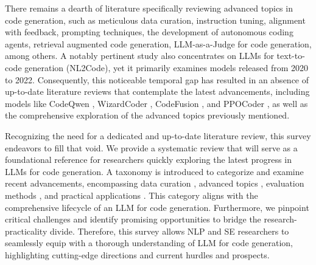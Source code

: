 There remains a dearth of literature specifically reviewing advanced topics in code generation, such as meticulous data curation, instruction tuning, alignment with feedback, prompting techniques, the development of autonomous coding agents, retrieval augmented code generation, LLM-as-a-Judge for code generation, among others.
A notably pertinent study \cite{athiwaratkun2022multi,zan2023large} also concentrates on LLMs for text-to-code generation (NL2Code), yet it primarily examines models released from 2020 to 2022. 
Consequently, this noticeable temporal gap has resulted in an absence of up-to-date literature reviews that contemplate the latest advancements, including models like CodeQwen \cite{codeqwen}, WizardCoder \cite{luo2023wizardcoder}, CodeFusion \cite{singh2023codefusion}, and PPOCoder \cite{shojaee2023execution}, as well as the comprehensive exploration of the advanced topics previously mentioned.

% 

Recognizing the need for a dedicated and up-to-date literature review, this survey endeavors to fill that void. We provide a systematic review that will serve as a foundational reference for researchers quickly exploring the latest progress in LLMs for code generation. 
A taxonomy is introduced to categorize and examine recent advancements, encompassing data curation \cite{wang2023self,luo2023wizardcoder,wei2023magicoder}, advanced topics \cite{parvez2021retrieval,lu2022reacc,le2022coderl,muennighoff2023octopack,liu2023rltf,chen2022codet,ni2023lever,chen2023teaching,huang2023agentcoder,shrivastava2023repofusion,zhang2023repocoder}, evaluation methods \cite{chen2021evaluating,hendrycks2021measuring,jimenez2023swe,zhuo2024ice}, and practical applications \cite{chen2021evaluating,zheng2023codegeex}. This category aligns with the comprehensive lifecycle of an LLM for code generation.
Furthermore, we pinpoint critical challenges and identify promising opportunities to bridge the research-practicality divide. Therefore, this survey allows NLP and SE researchers to seamlessly equip with a thorough understanding of LLM for code generation, highlighting cutting-edge directions and current hurdles and prospects.

